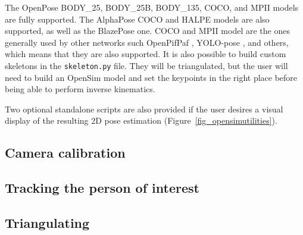The OpenPose BODY\_25, BODY\_25B, BODY\_135, COCO, and MPII models are fully supported. The AlphaPose COCO and HALPE models are also supported, as well as the BlazePose one. COCO and MPII model are the ones generally used by other networks such  OpenPifPaf \cite{Kreiss2021}, YOLO-pose \cite{Maji2022, Wang2022b}, and others, which means that they are also supported. It is also possible to build custom skeletons in the \texttt{skeleton.py} file. They will be triangulated, but the user will need to build an OpenSim model and set the keypoints in the right place before being able to perform inverse kinematics.

Two optional standalone scripts are also provided if the user desires a visual display of the resulting 2D pose estimation (Figure~\ref{fig_opensimutilities}).


\subsection{Camera calibration}

\subsection{Tracking the person of interest}

\subsection{Triangulating}



